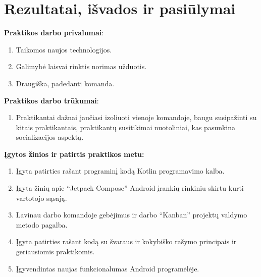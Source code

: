 \documentclass{VUMIFPSPraktika}
\begin{document}
\maketitle
\tableofcontents






\section{Rezultatai, išvados ir pasiūlymai}

\textbf{Praktikos darbo privalumai}:
\begin{enumerate}
    \item Taikomos naujos technologijos.
    \item Galimybė laisvai rinktis norimas užduotis.
    \item Draugiška, padedanti komanda.
\end{enumerate}
\bigskip

\textbf{Praktikos darbo trūkumai}:
\begin{enumerate}
    \item Praktikantai dažnai jaučiasi izoliuoti vienoje komandoje, baugu susipažinti su kitais praktikantais, praktikantų susitikimai nuotoliniai, kas pasunkina socializacijos aspektą.
\end{enumerate}
\bigskip

\textbf{Įgytos žinios ir patirtis praktikos metu:}
\begin{enumerate}
    \item Įgyta patirties rašant programinį kodą Kotlin programavimo kalba.
    \item Įgyta žinių apie “Jetpack Compose” Android įrankių rinkiniu skirtu kurti vartotojo sąsają.
    \item Lavinau darbo komandoje gebėjimus ir darbo \enquote{Kanban} projektų valdymo metodo pagalba.
    \item Įgyta patirties rašant kodą su švaraus ir kokybiško rašymo principais ir geriausiomis praktikomis. 
    \item Įgyvendintas naujas funkcionalumas Android programėlėje.
\end{enumerate}
\bigskip
\end{document}

